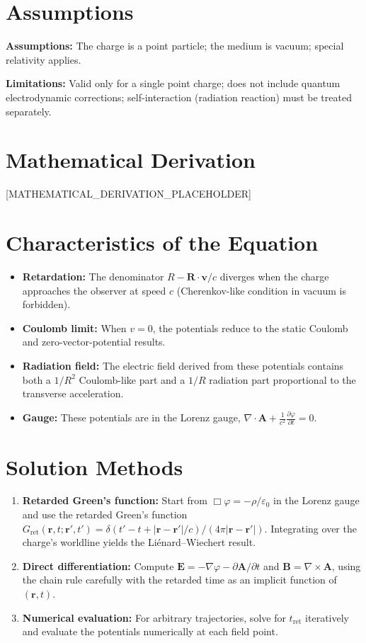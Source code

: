 \documentclass[11pt,openright]{book}
\begin{document}
\section*{Assumptions}

\textbf{Assumptions:} The charge is a point particle; the medium is vacuum; special relativity applies.


\textbf{Limitations:} Valid only for a single point charge; does not include quantum electrodynamic corrections; self-interaction (radiation reaction) must be treated separately.


\section*{Mathematical Derivation}

[MATHEMATICAL_DERIVATION_PLACEHOLDER]

\section*{Characteristics of the Equation}

\begin{itemize}
  \item \textbf{Retardation:} The denominator $R - \mathbf{R}\cdot\mathbf{v}/c$ diverges when the charge approaches the observer at speed $c$ (Cherenkov-like condition in vacuum is forbidden).
  \item \textbf{Coulomb limit:} When $v = 0$, the potentials reduce to the static Coulomb and zero-vector-potential results.
  \item \textbf{Radiation field:} The electric field derived from these potentials contains both a $1/R^{2}$ Coulomb-like part and a $1/R$ radiation part proportional to the transverse acceleration.
  \item \textbf{Gauge:} These potentials are in the Lorenz gauge, $\nabla\cdot\mathbf{A} + \frac{1}{c^{2}}\frac{\partial\varphi}{\partial t} = 0$.
\end{itemize}
\section*{Solution Methods}

\begin{enumerate}
  \item \textbf{Retarded Green's function:} Start from $\Box\varphi = -\rho/\varepsilon_{0}$ in the Lorenz gauge and use the retarded Green's function $G_{\text{ret}}(\mathbf{r},t;\mathbf{r}',t') = \delta(t' - t + |\mathbf{r}-\mathbf{r}'|/c)/(4\pi|\mathbf{r}-\mathbf{r}'|)$. Integrating over the charge's worldline yields the Liénard--Wiechert result.
  \item \textbf{Direct differentiation:} Compute $\mathbf{E} = -\nabla\varphi - \partial\mathbf{A}/\partial t$ and $\mathbf{B} = \nabla\times\mathbf{A}$, using the chain rule carefully with the retarded time as an implicit function of $(\mathbf{r}, t)$.
  \item \textbf{Numerical evaluation:} For arbitrary trajectories, solve for $t_{\text{ret}}$ iteratively and evaluate the potentials numerically at each field point.
\end{enumerate}
\end{document}
